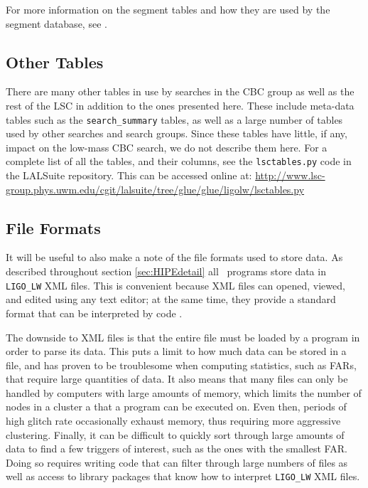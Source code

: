 For more information on the segment tables and how they are used by the segment
database, see \cite{BPP:segdb}.

\subsection{Other Tables}
\label{sec:other_tables}

There are many other tables in use by searches in the \ac{CBC} group as well as
the rest of the \ac{LSC} in addition to the ones presented here. These include
meta-data tables such as the \texttt{search\_summary} tables, as well as a
large number of tables used by other searches and search groups. Since these
tables have little, if any, impact on the low-mass \ac{CBC} search, we do not
describe them here. For a complete list of all the tables, and their columns,
see the \texttt{lsctables.py} code in the LALSuite repository. This can be
accessed online at:
\url{http://www.lsc-group.phys.uwm.edu/cgit/lalsuite/tree/glue/glue/ligolw/lsctables.py}

\subsection{File Formats}
\label{sec:file_formats}

It will be useful to also make a note of the file formats used to store data.
As described throughout section \ref{sec:HIPEdetail} all \hipe~programs store
data in \verb|LIGO_LW| XML files. This is convenient because XML files can
opened, viewed, and edited using any text editor; at the same time, they
provide a standard format that can be interpreted by code
\cite{tech:Williams:2005}.

The downside to XML files is that the entire file must be loaded by a program
in order to parse its data. This puts a limit to how much data can be stored in
a file, and has proven to be troublesome when computing statistics, such as
\acp{FAR}, that require large quantities of data. It also means that many files
can only be handled by computers with large amounts of memory, which limits the
number of nodes in a cluster a that a program can be executed on. Even then,
periods of high glitch rate occasionally exhaust memory, thus requiring more
aggressive clustering. Finally, it can be difficult to quickly sort through
large amounts of data to find a few triggers of interest, such as the ones with
the smallest \ac{FAR}. Doing so requires writing code that can filter through
large numbers of files as well as access to library packages that know how to
interpret \verb|LIGO_LW| XML files.

